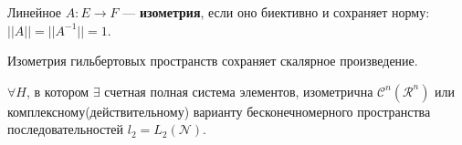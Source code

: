 \begin{to_def}
	Линейное $A\colon E \to F$ --- \textbf{изометрия}, если оно биективно и сохраняет норму: $||A|| = ||A^{-1}|| = 1$.
\end{to_def}

\begin{to_lem}
	Изометрия гильбертовых пространств сохраняет скалярное произведение.
\end{to_lem}

\begin{to_thr}
	$\forall H$, в котором $\exists$ счетная полная система элементов, изометрична $\mathcal{C}^n (\mathcal{R}^n)$ или комплексному(действительному) варианту бесконечномерного пространства последовательностей $l_2 = L_2(\mathcal{N})$.
\end{to_thr}